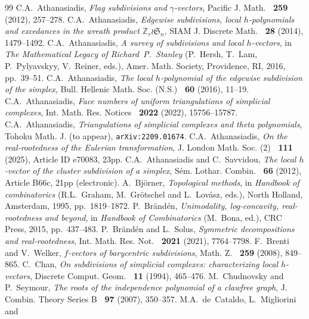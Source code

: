 \documentclass[11pt]{amsart}
\begin{document}
\begin{thebibliography}{99}
%
C.A.~Athanasiadis,
\textit{Flag subdivisions and $\gamma$-vectors},
Pacific J. Math. {\bf~259} (2012), 257--278.
%
C.A.~Athanasiadis,
\textit{Edgewise subdivisions, local $h$-polynomials 
and excedances in the wreath product 
${\mathbb Z}_r \wr \mathfrak{S}_n$},
SIAM J. Discrete Math. {\bf~28} (2014), 1479--1492.
%
C.A.~Athanasiadis,
\textit{A survey of subdivisions and local $h$-vectors},
in \textit{The Mathematical Legacy of Richard~P.~Stanley}
(P.~Hersh, T.~Lam, P.~Pylyavskyy, V.~Reiner, eds.),
Amer. Math. Society, Providence, RI, 2016, pp.~39--51.
%
C.A.~Athanasiadis,
\textit{The local $h$-polynomial of the edgewise 
subdivision of the simplex},
Bull. Hellenic Math. Soc. (N.S.) {\bf~60} (2016), 
11--19.
%
C.A.~Athanasiadis, 
\textit{Face numbers of uniform triangulations of 
simplicial complexes},
Int. Math. Res. Notices {\bf~2022} (2022), 
15756--15787.
%
C.A.~Athanasiadis, 
\textit{Triangulations of simplicial complexes and
theta polynomials},
Tohoku Math. J. (to appear), 
{\tt arXiv:2209.01674}.
%
C.A.~Athanasiadis,
\textit{On the real-rootedness of the Eulerian 
transformation},
J. London Math. Soc. (2) {\bf~111} (2025), 
Article ID e70083, 23pp.
%
C.A.~Athanasiadis and C.~Savvidou,
\textit{The local $h$-vector of the cluster subdivision 
of a simplex},
S\'em. Lothar. Combin. {\bf~66} (2012), Article B66c, 
21pp (electronic).
%
A.~Bj\"orner,
\textit{Topological methods}, 
in \textit{Handbook of combinatorics}
(R.L.~Graham, M.~Gr\"otschel and L.~Lov\'asz, eds.),
North Holland, Amsterdam, 1995, pp.~1819--1872.
%
P.~Br\"and\'en,
\textit{Unimodality, log-concavity, real-rootedness 
and beyond},
in \textit{Handbook of Combinatorics} (M.~Bona, ed.), 
CRC Press, 2015, pp.~437--483.
%
P.~Br\"and\'en and L.~Solus,
\textit{Symmetric decompositions and real-rootedness},
Int. Math. Res. Not. {\bf~2021} (2021), 7764--7798.
%  
F.~Brenti and V.~Welker, 
\textit{$f$-vectors of barycentric subdivisions}, 
Math. Z. {\bf~259} (2008), 849--865.
%
C.~Chan,
\textit{On subdivisions of simplicial complexes: 
characterizing local $h$-vectors},
Discrete Comput. Geom. {\bf~11} (1994), 465--476.
%
M.~Chudnovsky and P.~Seymour,
\textit{The roots of the independence polynomial
of a clawfree graph},
J. Combin. Theory Series B {\bf~97} (2007), 
350--357.
%
M.A.~de~Cataldo, L.~Migliorini and 

\end{thebibliography}
\end{document}
